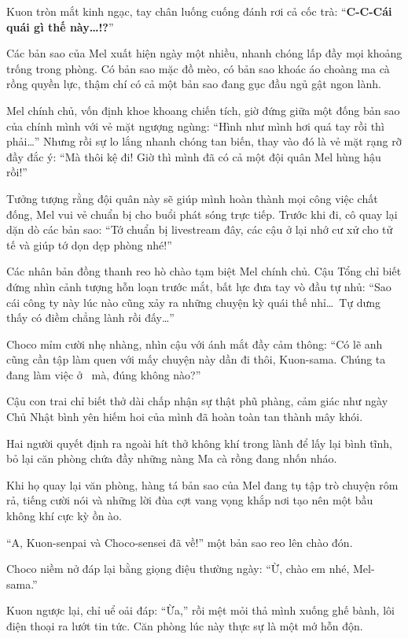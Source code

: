 \documentclass[../main.tex]{subfiles}
\begin{document}
Kuon tròn mắt kinh ngạc, tay chân luống cuống đánh rơi cả cốc trà: ``\textbf{C-C-Cái quái gì thế này\dots!?}''


Các bản sao của Mel xuất hiện ngày một nhiều, nhanh chóng lấp đầy mọi khoảng trống trong phòng. Có bản sao mặc đồ mèo, có bản sao khoác áo choàng ma cà rồng quyền lực, thậm chí có cả một bản sao đang gục đầu ngủ gật ngon lành.

Mel chính chủ, vốn định khoe khoang chiến tích, giờ đứng giữa một đống bản sao của chính mình với vẻ mặt ngượng ngùng: ``Hình như mình hơi quá tay rồi thì phải\dots'' Nhưng rồi sự lo lắng nhanh chóng tan biến, thay vào đó là vẻ mặt rạng rỡ đầy đắc ý: ``Mà thôi kệ đi! Giờ thì mình đã có cả một đội quân Mel hùng hậu rồi!''

Tưởng tượng rằng đội quân này sẽ giúp mình hoàn thành mọi công việc chất đống, Mel vui vẻ chuẩn bị cho buổi phát sóng trực tiếp. Trước khi đi, cô quay lại dặn dò các bản sao: ``Tớ chuẩn bị livestream đây, các cậu ở lại nhớ cư xử cho tử tế và giúp tớ dọn dẹp phòng nhé!''

Các nhân bản đồng thanh reo hò chào tạm biệt Mel chính chủ. Cậu Tổng chỉ biết đứng nhìn cảnh tượng hỗn loạn trước mắt, bất lực đưa tay vò đầu tự nhủ: ``Sao cái công ty này lúc nào cũng xảy ra những chuyện kỳ quái thế nhỉ\dots\ Tự dưng thấy có điềm chẳng lành rồi đấy\dots''

Choco mỉm cười nhẹ nhàng, nhìn cậu với ánh mắt đầy cảm thông: ``Có lẽ anh cũng cần tập làm quen với mấy chuyện này dần đi thôi, Kuon-sama. Chúng ta đang làm việc ở \hll\ mà, đúng không nào?''

Cậu con trai chỉ biết thở dài chấp nhận sự thật phũ phàng, cảm giác như ngày Chủ Nhật bình yên hiếm hoi của mình đã hoàn toàn tan thành mây khói.

Hai người quyết định ra ngoài hít thở không khí trong lành để lấy lại bình tĩnh, bỏ lại căn phòng chứa đầy những nàng Ma cà rồng đang nhốn nháo.

\ct

Khi họ quay lại văn phòng, hàng tá bản sao của Mel đang tụ tập trò chuyện rôm rả, tiếng cười nói và những lời đùa cợt vang vọng khắp nơi tạo nên một bầu không khí cực kỳ ồn ào.

``A, Kuon-senpai và Choco-sensei đã về!'' một bản sao reo lên chào đón.

Choco niềm nở đáp lại bằng giọng điệu thường ngày: ``Ừ, chào em nhé, Mel-sama.''

Kuon ngược lại, chỉ uể oải đáp: ``Ừa,'' rồi mệt mỏi thả mình xuống ghế bành, lôi điện thoại ra lướt tin tức. Căn phòng lúc này thực sự là một mớ hỗn độn.
\end{document}
